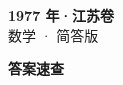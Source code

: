 \documentclass[zihao=-4, a4paper]{ctexart}
\begin{document}
\begin{center}
  {\Large\bfseries 1977 年·江苏卷}\\[4pt]
  {\large 数学 · 简答版}
\end{center}
\medskip
{}

\clearpage
{}
\begin{center}{\Large\bfseries 答案速查}\end{center}
\medskip

\end{document}
